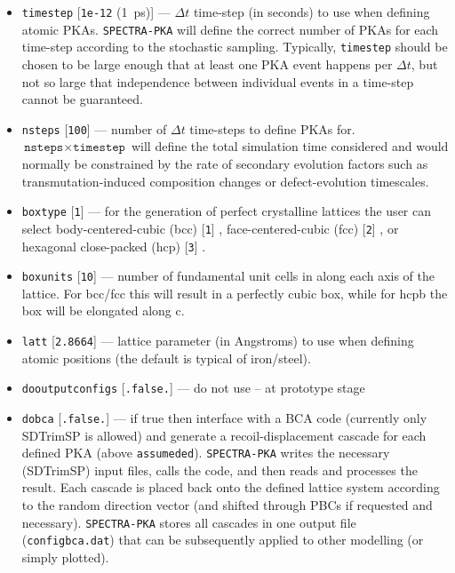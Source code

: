 \documentclass[a4paper]{article}
\begin{document}
\begin{itemize}
\item \texttt{timestep} [\texttt{1e-12} (1~ps)] --- \(\Delta t\) time-step (in seconds) to use when defining atomic PKAs. \texttt{SPECTRA-PKA} will define the correct number of PKAs for each time-step according to the stochastic sampling. Typically, \texttt{timestep}  should be chosen to be large enough that at least one PKA event happens per \(\Delta t\), but not so large that independence between individual events in a time-step cannot be guaranteed.

\item \texttt{nsteps} [\texttt{100}] --- number of \(\Delta t\) time-steps to define PKAs for. \(\texttt{nsteps}\times\texttt{timestep}\) will define the total simulation time considered and would normally be constrained by the rate of secondary evolution factors such as transmutation-induced composition changes or defect-evolution timescales.

\item \texttt{box{\textunderscore}type} [\texttt{1}] --- for the generation of perfect crystalline lattices the user can select body-centered-cubic (bcc)  [\texttt{1}] , face-centered-cubic (fcc)  [\texttt{2}] , or hexagonal close-packed (hcp)  [\texttt{3}] .

\item \texttt{box{\textunderscore}units} [\texttt{10}] --- number of fundamental unit cells in along each axis of the lattice. For bcc/fcc this will result in a perfectly cubic box, while for hcpb the box will be elongated along c.

\item \texttt{latt} [\texttt{2.8664}] --- lattice parameter (in Angstroms) to use when defining atomic positions (the default is typical of iron/steel).

\item \texttt{do{\textunderscore}output{\textunderscore}configs} [\texttt{.false.}] --- do not use -- at prototype stage

\item \texttt{do{\textunderscore}bca} [\texttt{.false.}] --- if true then interface with a BCA code (currently only SDTrimSP is allowed) and generate a recoil-displacement cascade for each defined PKA (above \texttt{assumed{\textunderscore}ed}). \texttt{SPECTRA-PKA}  writes the necessary (SDTrimSP) input files, calls the code, and then reads and processes the result. Each cascade is placed back onto the defined lattice system according to the random direction vector (and shifted through PBCs if requested and necessary). \texttt{SPECTRA-PKA}  stores all cascades in one output file (\texttt{config{\textunderscore}bca.dat}) that can be subsequently applied to other modelling (or simply plotted).


\end{itemize}
\end{document}
